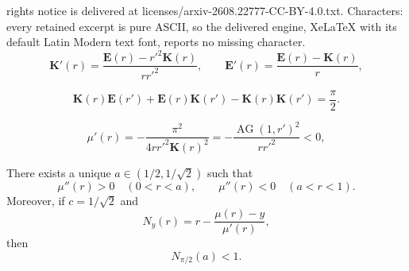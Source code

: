 \documentclass[10pt,a4paper]{amsart}
\newcommand{\Ec}{\mathbf E}
\newcommand{\Kc}{\mathbf K}
\newcommand{\M}{\operatorname{AG}}
\begin{document}
rights notice is delivered at licenses/arxiv-2608.22777-CC-BY-4.0.txt. Characters: every retained excerpt is pure ASCII, so the delivered engine, XeLaTeX with its default Latin Modern text font, reports no missing character.
\begin{equation}\label{eq:KE-derivatives}
 \Kc'(r)=\frac{\Ec(r)-r'^2\Kc(r)}{rr'^2},
 \qquad
 \Ec'(r)=\frac{\Ec(r)-\Kc(r)}r,
\end{equation}

\begin{equation}\label{eq:legendredcsdcs}
 \Kc(r)\Ec(r')+\Ec(r)\Kc(r')
 -\Kc(r)\Kc(r')=\frac{\pi}{2}.
\end{equation}

\begin{equation}\label{eq:mu-prime}
 \mu'(r)=-\frac{\pi^2}{4rr'^2\Kc(r)^2}
 =-\frac{\M(1,r')^2}{rr'^2}<0,
\end{equation}

\begin{lemma}\label{lem:inflection}
There exists a unique $a\in(1/2,1/\sqrt2)$ such that
\begin{equation}\label{eq:convex-concave}
 \mu''(r)>0\quad(0<r<a),
 \qquad
 \mu''(r)<0\quad(a<r<1).
\end{equation}
Moreover, if $c=1/\sqrt2$ and
\[
 N_y(r)=r-\frac{\mu(r)-y}{\mu'(r)},
\]
then
\begin{equation}\label{eq:key-barrier}
 N_{\pi/2}(a)<1.
\end{equation}
\end{lemma}
\end{document}
